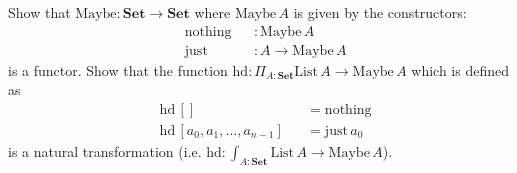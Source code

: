 \documentclass{article}
\newcommand{\Set}{\mathbf{Set}}
\newcommand{\List}{\mathrm{List}}
\newcommand{\Maybe}{\mathrm{Maybe}}
\newcommand{\nothing}{\mathrm{nothing}}
\newcommand{\just}{\mathrm{just}}
\newcommand{\hd}{\mathrm{hd}}
\begin{document}
\begin{Exercise}\hfill

  \Question
    Show that $\Maybe : \Set \to \Set$ where $\Maybe\,A$ is given by the constructors:
    \begin{align*}
      &\nothing && : \Maybe\,A \\
      &\just && : A \to \Maybe\,A
    \end{align*}
   is a functor.
  \Question Show that the function $\hd : \Pi_{A:\Set}\List\,A \to \Maybe\,A$ which is defined as
    \begin{align*}
      &\hd\,[] && = \nothing \\
      &\hd\,  [a_0,a_1,\dots,a_{n-1}]  && = \just\,a_0
    \end{align*}
    is a natural transformation (i.e. $\hd : \int_{A:\Set}\List\,A \to \Maybe\,A$).

\end{Exercise}
\end{document}
